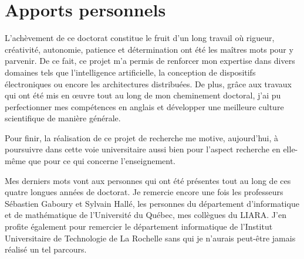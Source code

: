 \section{Apports personnels}

L'achèvement de ce doctorat constitue le fruit d'un long travail où rigueur, créativité, autonomie, patience et détermination ont été les maîtres mots pour y parvenir. De ce fait, ce projet m'a permis de renforcer mon expertise dans divers domaines tels que l’intelligence artificielle, la conception de dispositifs électroniques ou encore les architectures distribuées. De plus, grâce aux travaux qui ont été mis en \oe{}uvre tout au long de mon cheminement doctoral, j'ai pu perfectionner mes compétences en anglais et développer une meilleure culture scientifique de manière générale.

Pour finir, la réalisation de ce projet de recherche me motive, aujourd'hui, à poursuivre dans cette voie universitaire aussi bien pour l'aspect recherche en elle-même que pour ce qui concerne l'enseignement.

Mes derniers mots vont aux personnes qui ont été présentes tout au long de ces quatre longues années de doctorat. Je remercie encore une fois les professeurs Sébastien Gaboury et Sylvain Hallé, les personnes du département d’informatique et de mathématique de l'Université du Québec, mes collègues du \acs{LIARA}. J'en profite également pour remercier le département informatique de l'Institut Universitaire de Technologie de La Rochelle sans qui je n'aurais peut-être jamais réalisé un tel parcours.
